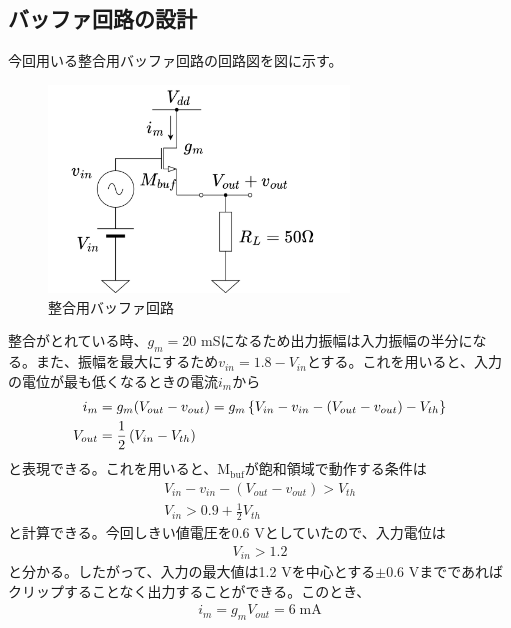 \documentclass[twocolumn]{jsarticle}
\begin{document}
    \subsection{バッファ回路の設計}
        今回用いる整合用バッファ回路の回路図を図に示す。
        \begin{figure}[H]
            \begin{center}
                \includegraphics*[width = 80mm]{figures/resister_buf.png}
                \caption{整合用バッファ回路}
                \label{fig:buf_circuit}
            \end{center}
        \end{figure}
        整合がとれている時、$g_{m}=20$ mSになるため出力振幅は入力振幅の半分になる。また、振幅を最大にするため$v_{in}=1.8-V_{in}$とする。これを用いると、入力の電位が最も低くなるときの電流$i_{m}$から
        \begin{align*}
            i_{m}&=g_{m}(V_{out}-v_{out})=g_{m}\left\{ V_{in}-v_{in} -(V_{out}-v_{out}) -V_{th} \right\}      \notag \\
            V_{out}&=\frac{1}{2}\left( V_{in}-V_{th} \right)
        \end{align*}
        と表現できる。これを用いると、$\mathrm{M_{buf}}$が飽和領域で動作する条件は
        \begin{align*}
            V_{in}-v_{in}-\left( V_{out}-v_{out} \right) > V_{th}   \\
            V_{in} > 0.9 +\frac{1}{2}V_{th}
        \end{align*}
        と計算できる。今回しきい値電圧を0.6 Vとしていたので、入力電位は
        \begin{align}
            V_{in}>1.2  \label{eq:buf_in_sat}
        \end{align}
        と分かる。したがって、入力の最大値は1.2 Vを中心とする$\pm 0.6$ Vまでであればクリップすることなく出力することができる。このとき、
        \begin{align*}
            i_{m}=g_{m}V_{out}=6\;\mathrm{mA}
        \end{align*}
\end{document}
